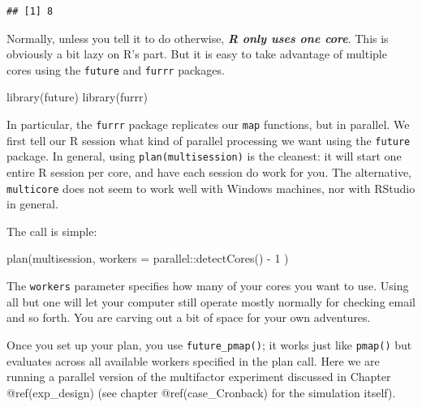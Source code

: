 \documentclass[
]{book}
\newenvironment{Shaded}{\begin{snugshade}}{\end{snugshade}}
\newcommand{\AttributeTok}[1]{\textcolor[rgb]{0.77,0.63,0.00}{#1}}
\newcommand{\ConstantTok}[1]{\textcolor[rgb]{0.00,0.00,0.00}{#1}}
\newcommand{\DecValTok}[1]{\textcolor[rgb]{0.00,0.00,0.81}{#1}}
\newcommand{\FunctionTok}[1]{\textcolor[rgb]{0.00,0.00,0.00}{#1}}
\newcommand{\NormalTok}[1]{#1}
\newcommand{\OtherTok}[1]{\textcolor[rgb]{0.56,0.35,0.01}{#1}}
\newcommand{\SpecialCharTok}[1]{\textcolor[rgb]{0.00,0.00,0.00}{#1}}
\begin{document}
\begin{verbatim}
## [1] 8
\end{verbatim}

Normally, unless you tell it to do otherwise, \textbf{\emph{R only uses one core}}.
This is obviously a bit lazy on R's part.
But it is easy to take advantage of multiple cores using the \texttt{future} and \texttt{furrr} packages.

\begin{Shaded}
\begin{Highlighting}[]
\FunctionTok{library}\NormalTok{(future)}
\FunctionTok{library}\NormalTok{(furrr)}
\end{Highlighting}
\end{Shaded}

In particular, the \texttt{furrr} package replicates our \texttt{map} functions, but in parallel.
We first tell our R session what kind of parallel processing we want using the \texttt{future} package.
In general, using \texttt{plan(multisession)} is the cleanest: it will start one entire R session per core, and have each session do work for you.
The alternative, \texttt{multicore} does not seem to work well with Windows machines, nor with RStudio in general.

The call is simple:

\begin{Shaded}
\begin{Highlighting}[]
\FunctionTok{plan}\NormalTok{(multisession, }\AttributeTok{workers =}\NormalTok{ parallel}\SpecialCharTok{::}\FunctionTok{detectCores}\NormalTok{() }\SpecialCharTok{{-}} \DecValTok{1}\NormalTok{ )}
\end{Highlighting}
\end{Shaded}

The \texttt{workers} parameter specifies how many of your cores you want to use.
Using all but one will let your computer still operate mostly normally for checking email and so forth.
You are carving out a bit of space for your own adventures.

Once you set up your plan, you use \texttt{future\_pmap()}; it works just like \texttt{pmap()} but evaluates across all available workers specified in the plan call.
Here we are running a parallel version of the multifactor experiment discussed in Chapter @ref(exp\_design) (see chapter @ref(case\_Cronback) for the simulation itself).

\begin{Shaded}
\end{Shaded}
\end{document}
